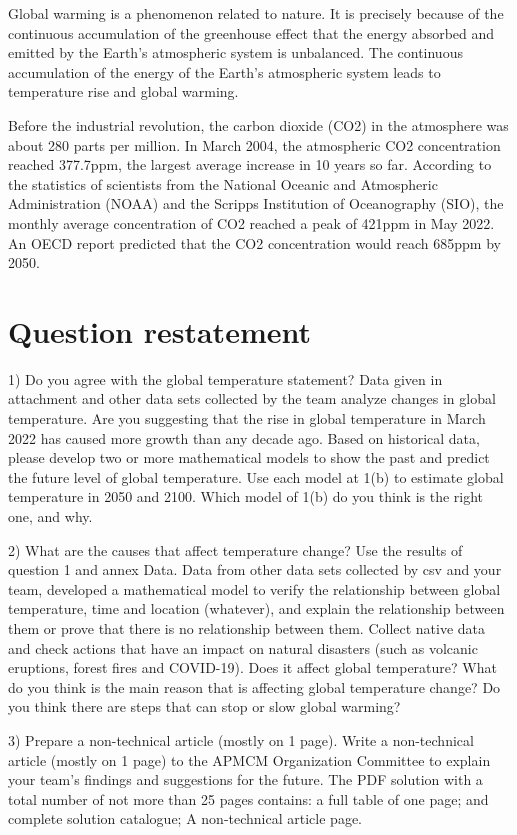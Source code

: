 \documentclass{apmcmthesis}
\begin{document}
Global warming is a phenomenon related to nature. 
It is precisely because of the continuous accumulation of the greenhouse effect that the energy absorbed and emitted by the Earth's atmospheric system is unbalanced. 
The continuous accumulation of the energy of the Earth's atmospheric system leads to temperature rise and global warming.

Before the industrial revolution, the carbon dioxide (CO2) in the atmosphere was about 280 parts per million. 
In March 2004, the atmospheric CO2 concentration reached 377.7ppm, the largest average increase in 10 years so far. 
According to the statistics of scientists from the National Oceanic and Atmospheric Administration (NOAA) and the Scripps Institution of Oceanography (SIO), 
the monthly average concentration of CO2 reached a peak of 421ppm in May 2022. 
An OECD report predicted that the CO2 concentration would reach 685ppm by 2050.

\section{Question restatement}

1) Do you agree with the global temperature statement? 
Data given in attachment and other data sets collected by the team analyze changes in global temperature.
Are you suggesting that the rise in global temperature in March 2022 has caused more growth than any decade ago.
Based on historical data, please develop two or more mathematical models to show the past and predict the future level of global temperature.
Use each model at 1(b) to estimate global temperature in 2050 and 2100.
Which model of 1(b) do you think is the right one, and why.

2) What are the causes that affect temperature change?
Use the results of question 1 and annex Data. 
Data from other data sets collected by csv and your team, developed a mathematical model to verify the relationship between global temperature, 
time and location (whatever), and explain the relationship between them or prove that there is no relationship between them.
Collect native data and check actions that have an impact on natural disasters (such as volcanic eruptions, forest fires and COVID-19). 
Does it affect global temperature? 
What do you think is the main reason that is affecting global temperature change?
Do you think there are steps that can stop or slow global warming?

3) Prepare a non-technical article (mostly on 1 page). Write a non-technical article (mostly on 1 page) 
to the APMCM Organization Committee to explain your team's findings and suggestions for the future.
The PDF solution with a total number of not more than 25 pages contains: 
a full table of one page; and complete solution catalogue; A non-technical article page.
\end{document}
